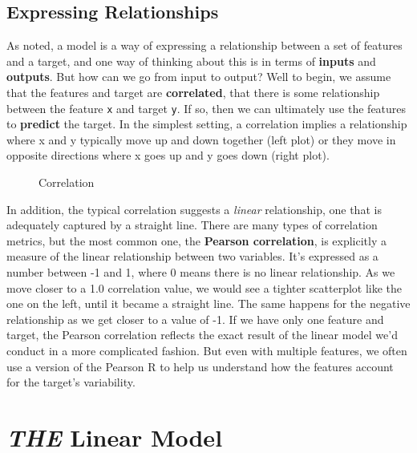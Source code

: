 \documentclass[
  letterpaper,
]{krantz}
\begin{document}
\subsection{Expressing Relationships}\label{sec-lm-relationships}

As noted, a model is a way of expressing a relationship between a set of
features and a target, and one way of thinking about this is in terms of
\textbf{inputs} and \textbf{outputs}. But how can we go from input to
output? Well to begin, we assume that the features and target are
\textbf{correlated}, that there is some relationship between the feature
\texttt{x} and target \texttt{y}. If so, then we can ultimately use the
features to \textbf{predict} the target. In the simplest setting, a
correlation implies a relationship where x and y typically move up and
down together (left plot) or they move in opposite directions where x
goes up and y goes down (right plot).

\begin{figure}[H]


\caption{\label{fig-corr-plot}Correlation}

\end{figure}%

In addition, the typical correlation suggests a \emph{linear}
relationship, one that is adequately captured by a straight line. There
are many types of correlation metrics, but the most common one, the
\textbf{Pearson correlation}, is explicitly a measure of the linear
relationship between two variables. It's expressed as a number between
-1 and 1, where 0 means there is no linear relationship. As we move
closer to a 1.0 correlation value, we would see a tighter scatterplot
like the one on the left, until it became a straight line. The same
happens for the negative relationship as we get closer to a value of -1.
If we have only one feature and target, the Pearson correlation reflects
the exact result of the linear model we'd conduct in a more complicated
fashion. But even with multiple features, we often use a version of the
Pearson R to help us understand how the features account for the
target's variability.

\section{\texorpdfstring{\emph{THE} Linear
Model}{THE Linear Model}}\label{sec-lm-linear-model}
\end{document}
